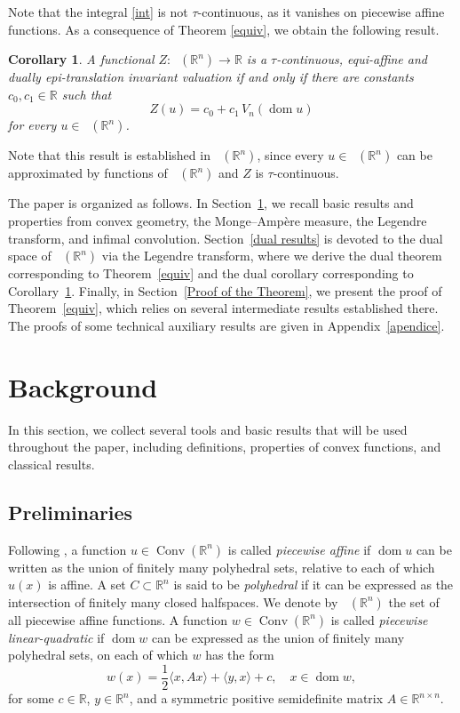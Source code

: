 \documentclass[11pt]{article}
\newtheorem{cor}[teo]{Corollary}
\theoremstyle{definition} %
\newcommand{\RR}{(\mathbb{R}^n)}
\DeclareMathOperator{\Conv}{Conv}
\DeclareMathOperator{\PA}{Conv_{p.a}}
\DeclareMathOperator{\dom}{dom}
\DeclareMathOperator{\LC}{Conv_{ld}}
\DeclareMathOperator{\LP}{Conv_{lp}}
\begin{document}
Note  that the integral \eqref{int}  is not $\tau$-continuous, as it vanishes on piecewise affine functions. As a consequence of Theorem \ref{equiv}, we obtain the following result.

\begin{cor}\label{cor1}
A functional  $Z: \LC\RR\rightarrow\mathbb{R}$ is a $\tau$-continuous, equi-affine  and dually epi-translation invariant valuation if and only if there are constants $c_0,c_1\in\mathbb{R}$ such that
$$Z(u)=c_0+c_1\,V_n(\dom u)$$ 
for every $u\in \LC\RR$.
\end{cor}


Note that this result is established in $\LC\RR$, since every $u \in \LC\RR$ can be approximated by functions of $\LP\RR$ and $Z$ is $\tau$-continuous.





The paper is organized as follows. In Section~\ref{preliminaries}, we recall basic results and properties from convex geometry, the Monge--Ampère measure, the Legendre transform, and infimal convolution. Section~\ref{dual results} is devoted to the dual space of $\LP(\mathbb{R}^n)$ via the Legendre transform, where we derive the dual theorem corresponding to Theorem~\ref{equiv} and the dual corollary corresponding to Corollary~\ref{cor1}. Finally, in Section~\ref{Proof of the Theorem}, we present the proof of Theorem~\ref{equiv}, which relies on several intermediate results established there. The proofs of some technical auxiliary results are given in Appendix~\ref{apendice}.




\section{Background}\label{preliminaries}
In this section, we collect several tools and basic results that will be used throughout the paper, including definitions, properties of convex functions, and classical results.  


\subsection{Preliminaries}\label{preli}
Following \cite{rockafellar2009variational},  a function $u\in\Conv\RR$ is called \textit{piecewise affine} if $\dom u$ can be written as the union of finitely many polyhedral sets, relative to each of which $u(x)$ is  affine. A set $C\subset\mathbb{R}^n$  is said to be  \textit{polyhedral}  if it can be expressed as the intersection of finitely many closed halfspaces. We denote by $\PA\RR$ the set of all piecewise affine functions.   A function $w\in \Conv\RR$ is called \textit{piecewise linear-quadratic} if $\dom w$ can be expressed  as the union of finitely many polyhedral sets, on each of which $w$ has the form
$$
w(x) = \frac{1}{2}\langle x,Ax\rangle + \langle y, x \rangle + c, \quad x\in \dom w,
$$
for some $c\in \mathbb{R}$, $y\in \mathbb{R}^n$, and a symmetric positive semidefinite matrix $A \in \mathbb{R}^{n \times n}$.
\end{document}
